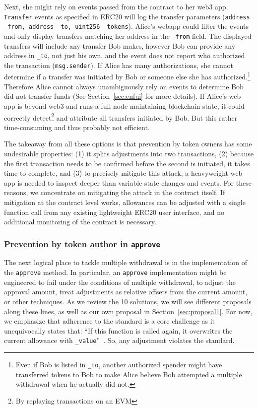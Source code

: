 Next, she might rely on events passed from the contract to her web3 app. \texttt{Transfer} events as specified in ERC20 will log the transfer parameters (\ie  \texttt{address \_from, address \_to, uint256 \_tokens}). Alice's webapp could filter the events and only display transfers matching her address in the \texttt{\_from} field. The displayed transfers will include any transfer Bob makes, however Bob can provide any address in \texttt{\_to}, not just his own, and the event does not report who authorized the transaction (\ie \texttt{msg.sender}). If Alice has many authorizations, she cannot determine if a transfer was initiated by Bob or someone else she has authorized.\footnote{Even if Bob is listed in \texttt{\_to}, another authorized spender might have transferred tokens to Bob to make Alice believe Bob attempted a multiple withdrawal when he actually did not.} Therefore Alice cannot always unambiguously rely on events to determine Bob did not transfer funds (See Section~\ref{sec:enfui} for more details). If Alice's web app is beyond web3 and runs a full node maintaining blockchain state, it could correctly detect\footnote{By replaying transactions on an EVM} and attribute all transfers initiated by Bob. But this rather time-consuming and thus probably not efficient.

The takeaway from all these options is that prevention by token owners has some undesirable properties: (1) it splits adjustments into two transactions, (2) because the first transaction needs to be confirmed before the second is initiated, it takes time to complete, and (3) to precisely mitigate this attack, a heavyweight web app is needed to inspect deeper than variable state changes and events. For these reasons, we concentrate on mitigating the attack in the contract itself. If mitigation at the contract level works, allowances can be adjusted with a single function call from any existing lightweight ERC20 user interface, and no additional monitoring of the contract is necessary. 

\subsubsection*{Prevention by token author in \texttt{approve}} The next logical place to tackle multiple withdrawal is in the implementation of the \texttt{approve} method. In particular, an \texttt{approve} implementation might be engineered to fail under the conditions of multiple withdrawal, to adjust the approval amount, treat adjustments as relative offsets from the current amount, or other techniques. As we review the 10 solutions, we will see different proposals along these lines, as well as our own proposal in Section~\ref{sec:proposal1}. For now, we emphasize that adherence to the standard is a core challenge as it unequivocally states that: ``If this function is called again, it overwrites the current allowance with \texttt{\_value}''~\cite{Ref08}. So, any adjustment violates the standard.


